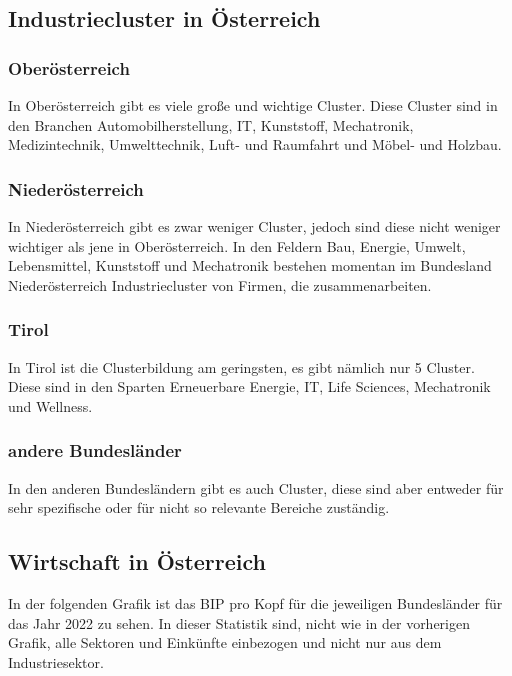 \subsection{Industriecluster in Österreich}

\subsubsection{Oberösterreich}

In Oberösterreich gibt es viele große und wichtige Cluster. Diese Cluster sind in den Branchen Automobilherstellung, IT, Kunststoff, Mechatronik, Medizintechnik, Umwelttechnik, Luft- und Raumfahrt und Möbel- und Holzbau.

\subsubsection{Niederösterreich}

In Niederösterreich gibt es zwar weniger Cluster, jedoch sind diese nicht weniger wichtiger als jene in Oberösterreich. In den Feldern Bau, Energie, Umwelt, Lebensmittel, Kunststoff und Mechatronik bestehen momentan im Bundesland Niederösterreich Industriecluster von Firmen, die zusammenarbeiten.   

\subsubsection{Tirol}

In Tirol ist die Clusterbildung am geringsten, es gibt nämlich nur 5 Cluster. Diese sind in den Sparten Erneuerbare Energie, IT, Life Sciences, Mechatronik und Wellness.

\subsubsection{andere Bundesländer}

In den anderen Bundesländern gibt es auch Cluster, diese sind aber entweder für sehr spezifische oder für nicht so relevante Bereiche zuständig.

\subsection{Wirtschaft in Österreich}

In der folgenden Grafik ist das BIP pro Kopf für die jeweiligen Bundesländer für das Jahr 2022 zu sehen. In dieser Statistik sind, nicht wie in der vorherigen Grafik, alle Sektoren und Einkünfte einbezogen und nicht nur aus dem Industriesektor.


